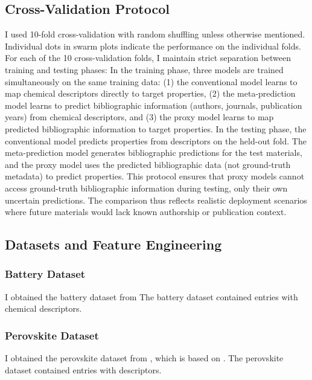 \documentclass[11pt, oneside]{article}
\begin{document}
\subsection{Cross-Validation Protocol}
I used 10-fold cross-validation with random shuffling unless otherwise mentioned. Individual dots in swarm plots indicate the performance on the individual folds. 
For each of the 10 cross-validation folds, I maintain strict separation between training and testing phases: In the training phase, three models are trained simultaneously on the same training data: (1) the conventional model learns to map chemical descriptors directly to target properties, (2) the meta-prediction model learns to predict bibliographic information (authors, journals, publication years) from chemical descriptors, and (3) the proxy model learns to map predicted bibliographic information to target properties.
In the testing phase, the conventional model predicts properties from descriptors on the held-out fold. 
The meta-prediction model generates bibliographic predictions for the test materials, and the proxy model uses the predicted bibliographic data (not ground-truth metadata) to predict properties.
This protocol ensures that proxy models cannot access ground-truth bibliographic information during testing, only their own uncertain predictions. The comparison thus reflects realistic deployment scenarios where future materials would lack known authorship or publication context.

\subsection{Datasets and Feature Engineering}

\subsubsection{Battery Dataset}
I obtained the battery dataset from \textcite{Huang2020}
The battery dataset contained  entries with  chemical descriptors.

\subsubsection{Perovskite Dataset} 
I obtained the perovskite dataset from \textcite{shabih2026autonomous}, which is based on \textcite{Jacobsson2021}.
The perovskite dataset contained  entries with  descriptors.
\end{document}
